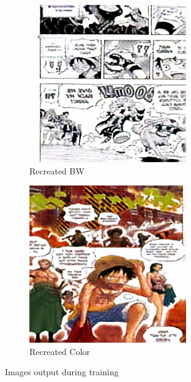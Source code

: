 \begin{figure}  
    \centering
    \begin{subfigure}[b]{0.3\textwidth}
        \includegraphics[width=\textwidth]{chapter/output/epoch100_rec_A.png}
        \caption{Recreated BW}
    \end{subfigure}
    \hfill
    \begin{subfigure}[b]{0.3\textwidth}
        \includegraphics[width=\textwidth]{chapter/output/epoch100_rec_B.png}
        \caption{Recreated Color}
    \end{subfigure}
    
    \caption{Images output during training}
    \label{fig:bad_images}
    
\end{figure}


